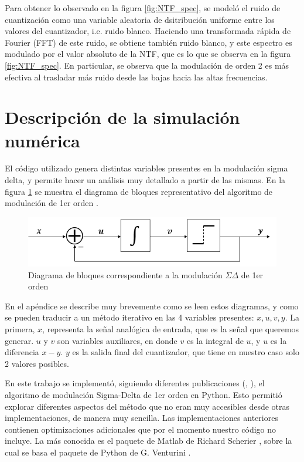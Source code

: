 \documentclass[twoside]{article}
\begin{document}
\begin{multicols}{2}
Para obtener lo observado en la figura \ref{fig:NTF_spec}, se modeló el ruido de cuantización como una variable aleatoria de dsitribución uniforme entre los valores del cuantizador, i.e. ruido blanco. Haciendo una transformada rápida de Fourier (FFT) de este ruido, se obtiene también ruido blanco, y este espectro es modulado por el valor absoluto de la NTF, que es lo que se observa en la figura \ref{fig:NTF_spec}. En particular, se observa que la modulación de orden 2 es más efectiva al trasladar más ruido desde las bajas hacia las altas frecuencias. 

\section{Descripción de la simulación numérica}

El código utilizado genera distintas variables presentes en la modulación sigma delta, y permite hacer un análisis muy detallado a partir de las mismas. En la figura \ref{fig:bloques} se muestra el diagrama de bloques representativo del algoritmo de modulación de 1er orden \cite{script}.

\begin{figure}[H]
\centering
\includegraphics[width=\linewidth]{figuras/bloques_1erorden.png}
\caption{Diagrama de bloques correspondiente a la modulación $\Sigma\Delta$ de 1er orden}
\label{fig:bloques}
\end{figure}

En el apéndice se describe muy brevemente como se leen estos diagramas, y como se pueden traducir a un método iterativo en las 4 variables presentes: $x,u,v,y$.
La primera, $x$, representa la señal analógica de entrada, que es la señal que queremos generar. $u$ y $v$ son variables auxiliares, en donde $v$ es la integral de $u$, y $u$ es la diferencia $x-y$. $y$ es la salida final del cuantizador, que tiene en nuestro caso solo 2 valores posibles.


En este trabajo se implementó, siguiendo diferentes publicaciones (\cite{delarosa2011}, \cite{aziz1996}), el algoritmo de modulación Sigma-Delta de 1er orden en Python. Esto permitió explorar diferentes aspectos del método que no eran muy accesibles desde otras implementaciones, de manera muy sencilla.
Las implementaciones anteriores contienen optimizaciones adicionales que por el momento nuestro código no incluye. La más conocida es el paquete de Matlab de Richard Scherier \cite{DSmatlab}, sobre la cual se basa el paquete de Python de G. Venturini \cite{DSpython}. %


\end{multicols}
\end{document}
